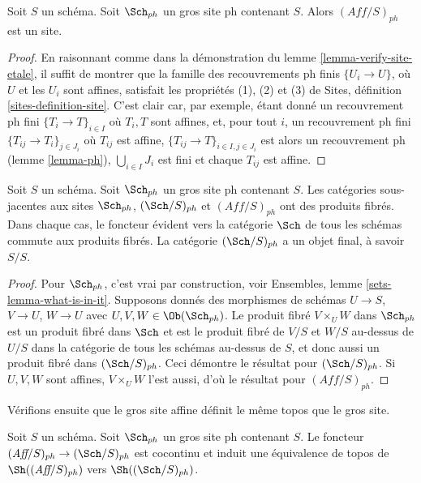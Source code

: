 \begin{lemma}
\label{lemma-verify-site-ph}
Soit $S$ un schéma. Soit $\Sch_{ph}$ un gros site ph
contenant $S$. Alors $(\textit{Aff}/S)_{ph}$ est un site.
\end{lemma}

\begin{proof}
En raisonnant comme dans la démonstration du lemme \ref{lemma-verify-site-etale},
il suffit de montrer que la famille des recouvrements ph finis
$\{U_i \to U\}$, où $U$ et les $U_i$ sont affines, satisfait les propriétés
(1), (2) et (3) de
Sites, définition \ref{sites-definition-site}.
C'est clair car, par exemple, étant donné un recouvrement ph fini
$\{T_i \to T\}_{i\in I}$ où $T_i, T$ sont affines, et, pour tout
$i$, un recouvrement ph fini $\{T_{ij} \to T_i\}_{j\in J_i}$ où $T_{ij}$ est
affine, $\{T_{ij} \to T\}_{i \in I, j\in J_i}$ est alors un recouvrement ph
(lemme \ref{lemma-ph}), $\bigcup_{i\in I} J_i$ est fini et
chaque $T_{ij}$ est affine.
\end{proof}

\begin{lemma}
\label{lemma-fibre-products-ph}
Soit $S$ un schéma. Soit $\Sch_{ph}$ un gros site ph
contenant $S$. Les catégories sous-jacentes aux sites
$\Sch_{ph}$, $(\Sch/S)_{ph}$ et $(\textit{Aff}/S)_{ph}$ ont des produits fibrés.
Dans chaque cas, le foncteur évident vers la catégorie $\Sch$ de
tous les schémas commute aux produits fibrés. La catégorie
$(\Sch/S)_{ph}$ a un objet final, à savoir $S/S$.
\end{lemma}

\begin{proof}
Pour $\Sch_{ph}$, c'est vrai par construction, voir
Ensembles, lemme \ref{sets-lemma-what-is-in-it}.
Supposons donnés des morphismes de schémas $U \to S$, $V \to U$, $W \to U$
avec $U, V, W \in \Ob(\Sch_{ph})$.
Le produit fibré $V \times_U W$ dans $\Sch_{ph}$
est un produit fibré dans $\Sch$ et
est le produit fibré de $V/S$ et $W/S$ au-dessus de $U/S$ dans
la catégorie de tous les schémas au-dessus de $S$, et donc aussi un
produit fibré dans $(\Sch/S)_{ph}$.
Ceci démontre le résultat pour $(\Sch/S)_{ph}$.
Si $U, V, W$ sont affines, $V \times_U W$ l'est aussi, d'où le
résultat pour $(\textit{Aff}/S)_{ph}$.
\end{proof}

\noindent
Vérifions ensuite que le gros site affine définit le même
topos que le gros site.

\begin{lemma}
\label{lemma-affine-big-site-ph}
Soit $S$ un schéma. Soit $\Sch_{ph}$ un gros site ph
contenant $S$.
Le foncteur $(\textit{Aff}/S)_{ph} \to (\Sch/S)_{ph}$
est cocontinu et induit une équivalence de topos de
$\Sh((\textit{Aff}/S)_{ph})$ vers
$\Sh((\Sch/S)_{ph})$.
\end{lemma}

